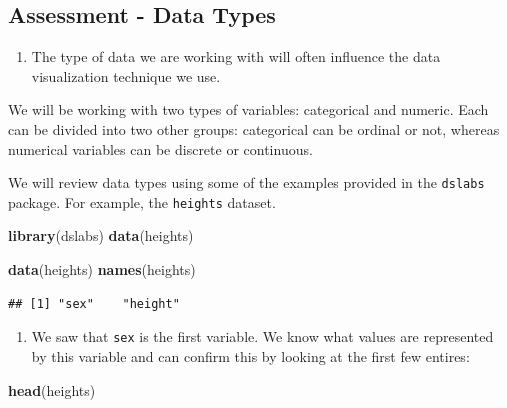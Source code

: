 \documentclass[
]{article}
\newenvironment{Shaded}{\begin{snugshade}}{\end{snugshade}}
\newcommand{\KeywordTok}[1]{\textcolor[rgb]{0.13,0.29,0.53}{\textbf{#1}}}
\newcommand{\NormalTok}[1]{#1}
\providecommand{\tightlist}{%
  \setlength{\itemsep}{0pt}\setlength{\parskip}{0pt}}
\begin{document}
\hypertarget{assessment---data-types}{%
\subsection{Assessment - Data Types}\label{assessment---data-types}}

\begin{enumerate}
\def\labelenumi{\arabic{enumi}.}
\tightlist
\item
  The type of data we are working with will often influence the data
  visualization technique we use.
\end{enumerate}

We will be working with two types of variables: categorical and numeric.
Each can be divided into two other groups: categorical can be ordinal or
not, whereas numerical variables can be discrete or continuous.

We will review data types using some of the examples provided in the
\texttt{dslabs} package. For example, the \texttt{heights} dataset.

\begin{Shaded}
\begin{Highlighting}[]
\KeywordTok{library}\NormalTok{(dslabs)}
\KeywordTok{data}\NormalTok{(heights)}
\end{Highlighting}
\end{Shaded}

\begin{Shaded}
\begin{Highlighting}[]
\KeywordTok{data}\NormalTok{(heights)}
\KeywordTok{names}\NormalTok{(heights)}
\end{Highlighting}
\end{Shaded}

\begin{verbatim}
## [1] "sex"    "height"
\end{verbatim}

\begin{enumerate}
\def\labelenumi{\arabic{enumi}.}
\setcounter{enumi}{1}
\tightlist
\item
  We saw that \texttt{sex} is the first variable. We know what values
  are represented by this variable and can confirm this by looking at
  the first few entires:
\end{enumerate}

\begin{Shaded}
\begin{Highlighting}[]
\KeywordTok{head}\NormalTok{(heights)}
\end{Highlighting}
\end{Shaded}
\end{document}
